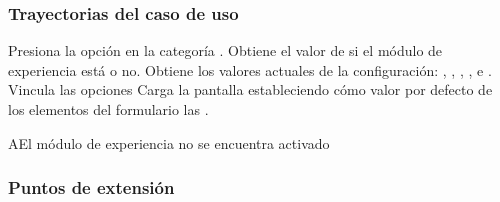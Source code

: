 \subsubsection{Trayectorias del caso de uso}

\begin{UCtrayectoria}%
   
  \Actor Presiona la opción {\bf {}} en la categoría
         .
  \Sistema Obtiene el valor de si el módulo de experiencia está  o no. 
  \Sistema Obtiene los valores actuales de la configuración:
           ,
           ,
           ,
           ,
            e
           .
  \Sistema Vincula las opciones 
  \Sistema Carga la pantalla  estableciendo cómo valor por defecto
           de los elementos del formulario las .

  \Actor 

\end{UCtrayectoria}

\begin{UCtrayectoriaA}{A}{El módulo de experiencia no se encuentra activado}
\end{UCtrayectoriaA}

\subsubsection{Puntos de extensión}


